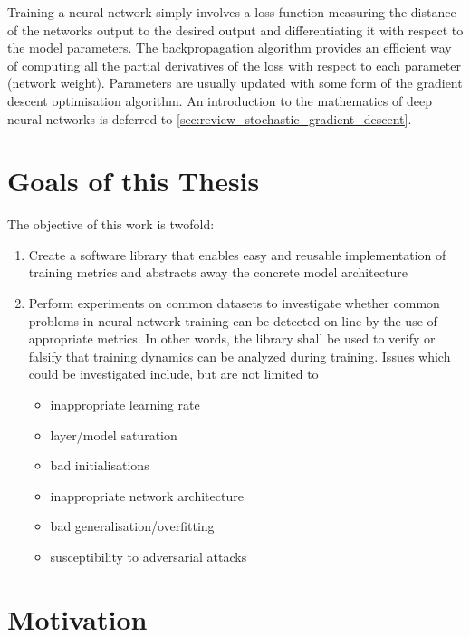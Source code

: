 Training a neural network simply involves a loss function measuring the distance
of the networks output to the desired output and differentiating it with respect
to the model parameters. The backpropagation algorithm provides an efficient way
of computing all the partial derivatives of the loss with respect to each
parameter (network weight). Parameters are usually updated with some form of the
gradient descent optimisation algorithm. An introduction to the mathematics of
deep neural networks is deferred to
\cref{sec:review_stochastic_gradient_descent}.

\hypertarget{sec:thesis-goals}{%
\section{Goals of this Thesis}\label{sec:thesis-goals}}

The objective of this work is twofold:

\begin{enumerate}
    \item
        Create a software library that enables easy and reusable
        implementation of training metrics and abstracts away the concrete model
        architecture
    \item
        Perform experiments on common datasets to investigate whether common
        problems in neural network training can be detected on-line by the use of
        appropriate metrics. In other words, the library shall be used to
        verify or falsify that training dynamics can be analyzed during
        training. Issues which could be investigated include, but are
        not limited to
        \begin{itemize}
            \item
                inappropriate learning rate
            \item
                layer/model saturation
            \item
                bad initialisations
            \item
                inappropriate network architecture
            \item
                bad generalisation/overfitting
            \item
                susceptibility to adversarial attacks
        \end{itemize}
\end{enumerate}

\hypertarget{sec:motivation}{%
\section{Motivation}\label{sec:motivation}}

